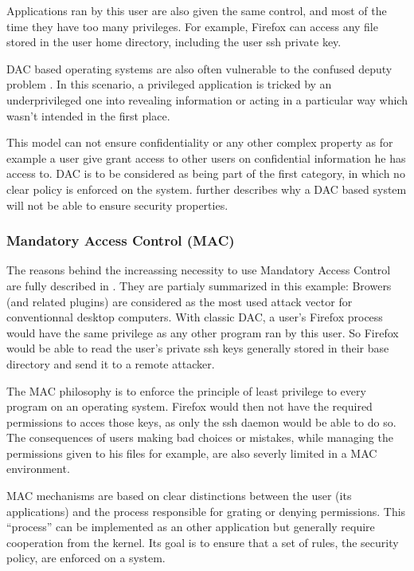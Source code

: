\documentclass[pdftex,a4paper,titlepage,11pt]{article}
\begin{document}
\bigskip

Applications ran by this user are also given the same control, and most of the
time they have too many privileges. For example, Firefox can access any file
stored in the user home directory, including the user ssh private key.

\bigskip

DAC based operating systems are also often vulnerable to the confused deputy
problem \cite{confuseddeputyproblem}. In this scenario, a privileged application
is tricked by an
underprivileged one into revealing information or acting in a particular way
which wasn't intended in the first place.

\bigskip

This model can not ensure confidentiality or any other complex property as for
example a user give grant access to other users on confidential information he
has access to. DAC is to be considered as being part of the first category, in
which no clear policy is enforced on the system. \cite{hru1976protection}
further
describes why a DAC based system will not be able to ensure security properties.

\subsubsection{Mandatory Access Control (MAC)}

The reasons behind the increassing necessity to use Mandatory Access Control are
fully described in \cite{inevitabilityoffailure1998}. They are partialy
summarized in this example:
Browers (and related plugins) are considered as the most used attack vector for
conventionnal desktop computers. With classic DAC, a user's Firefox process
would have the same privilege as any other program ran by this user. So Firefox
would be able to read the user's private ssh keys generally stored in their base
directory and send it to a remote attacker.

\bigskip

The MAC philosophy is to enforce the principle of least privilege to every
program on an operating system. Firefox would then not have the required
permissions to acces those keys, as only the ssh daemon would be able to do so.
The consequences of users making bad choices or mistakes, while managing the
permissions given to his files for example, are also severly limited in a MAC
environment.

\bigskip

MAC mechanisms are based on clear distinctions between the user (its
applications) and the process responsible for grating or denying permissions.
This ``process'' can be implemented as an other application but generally
require cooperation from the kernel. Its goal is to ensure that a set of rules,
the security policy, are enforced on a system.
\end{document}
